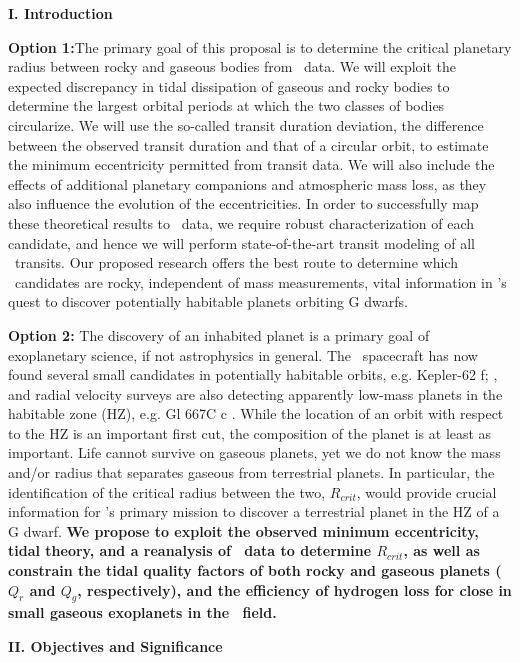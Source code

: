 \centerline{\bf I. Introduction}
\smallskip

\textbf{Option 1:}The primary goal of this proposal is to determine
the critical planetary radius between rocky and gaseous bodies from
\kepler~data. We will exploit the expected discrepancy in tidal
dissipation of gaseous and rocky bodies to determine the largest
orbital periods at which the two classes of bodies circularize. We
will use the so-called transit duration deviation, the difference
between the observed transit duration and that of a circular orbit, to
estimate the minimum eccentricity permitted from transit data. We will
also include the effects of additional planetary companions and
atmospheric mass loss, as they also influence the evolution of the
eccentricities. In order to successfully map these theoretical results
to \kepler~data, we require robust characterization of each candidate,
and hence we will perform state-of-the-art transit modeling of all
\kepler~transits. Our proposed research offers the best route to
determine which \kepler~candidates are rocky, independent of mass
measurements, vital information in \kepler's quest to discover
potentially habitable planets orbiting G dwarfs.

\textbf{Option 2:} The discovery of an inhabited planet is a primary
goal of exoplanetary science, if not astrophysics in general. The
\kepler~spacecraft has now found several small candidates in
potentially habitable orbits, e.g. Kepler-62 f; \cite{Borucki13}, and
radial velocity surveys are also detecting apparently low-mass planets
in the habitable zone (HZ), e.g. Gl 667C c
\cite{AngladaEscude12}. While the location of an orbit with respect to
the HZ is an important first cut, the composition of the planet is at
least as important. Life cannot survive on gaseous planets, yet we do
not know the mass and/or radius that separates gaseous from
terrestrial planets. In particular, the identification of the critical
radius between the two, $R_{crit}$, would provide crucial information
for \kepler's primary mission to discover a terrestrial planet in the
HZ of a G dwarf. {\bf We propose to exploit the observed minimum
  eccentricity, tidal theory, and a reanalysis of \kepler~data to
  determine $R_{crit}$, as well as constrain the tidal quality factors
  of both rocky and gaseous planets ($Q_r$ and $Q_g$, respectively),
  and the efficiency of hydrogen loss for close in small gaseous
  exoplanets in the \kepler~field.}

\bigskip
\centerline{\bf II. Objectives and Significance}
\smallskip


